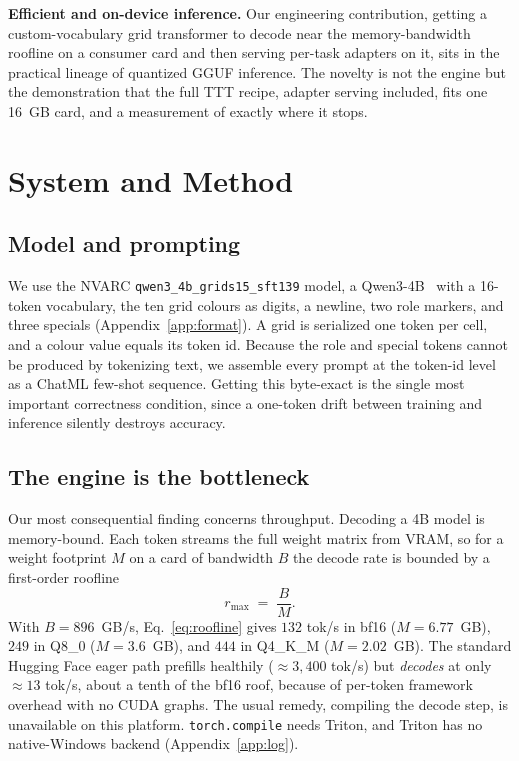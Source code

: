 \documentclass[11pt]{article}
\begin{document}
\textbf{Efficient and on-device inference.} Our engineering contribution, getting a custom-vocabulary
grid transformer to decode near the memory-bandwidth roofline on a consumer card and then serving
per-task adapters on it, sits in the practical lineage of quantized GGUF inference. The novelty is
not the engine but the demonstration that the full TTT recipe, adapter serving included, fits one
16~GB card, and a measurement of exactly where it stops.

\section{System and Method}
\label{sec:method}

\subsection{Model and prompting}
\label{sec:model}
We use the NVARC \texttt{qwen3\_4b\_grids15\_sft139} model, a Qwen3-4B~\cite{qwen3} with a 16-token
vocabulary, the ten grid colours as digits, a newline, two role markers, and three specials
(Appendix~\ref{app:format}). A grid is serialized one token per cell, and a colour value equals its
token id. Because the role and special tokens cannot be produced by tokenizing text, we assemble
every prompt at the token-id level as a ChatML few-shot sequence. Getting this byte-exact is the
single most important correctness condition, since a one-token drift between training and inference
silently destroys accuracy.

\subsection{The engine is the bottleneck}
\label{sec:engine}
Our most consequential finding concerns throughput. Decoding a 4B model is memory-bound. Each token
streams the full weight matrix from VRAM, so for a weight footprint $M$ on a card of bandwidth $B$
the decode rate is bounded by a first-order roofline
\begin{equation}
r_{\max} \;=\; \frac{B}{M}.
\label{eq:roofline}
\end{equation}
With $B=896$~GB/s, Eq.~\eqref{eq:roofline} gives $132$ tok/s in bf16 ($M=6.77$~GB), $249$ in Q8\_0
($M=3.6$~GB), and $444$ in Q4\_K\_M ($M=2.02$~GB). The standard Hugging Face eager path prefills
healthily ($\approx 3{,}400$ tok/s) but \emph{decodes} at only $\approx 13$ tok/s, about a tenth of
the bf16 roof, because of per-token framework overhead with no CUDA graphs. The usual remedy,
compiling the decode step, is unavailable on this platform. \texttt{torch.compile} needs Triton, and
Triton has no native-Windows backend (Appendix~\ref{app:log}).
\end{document}
